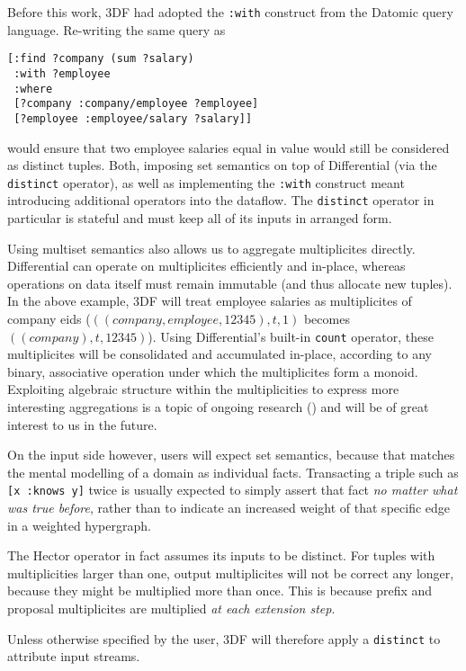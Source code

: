 \documentclass[../index.tex]{subfiles}
\begin{document}
Before this work, 3DF had adopted the \texttt{:with} construct from
the Datomic query language. Re-writing the same query as

\begin{verbatim}
[:find ?company (sum ?salary)
 :with ?employee
 :where
 [?company :company/employee ?employee]
 [?employee :employee/salary ?salary]]
\end{verbatim}

would ensure that two employee salaries equal in value would still be
considered as distinct tuples. Both, imposing set semantics on top of
Differential (via the \texttt{distinct} operator), as well as
implementing the \texttt{:with} construct meant introducing additional
operators into the dataflow. The \texttt{distinct} operator in
particular is stateful and must keep all of its inputs in arranged
form.

Using multiset semantics also allows us to aggregate multiplicites
directly. Differential can operate on multiplicites efficiently and
in-place, whereas operations on data itself must remain immutable (and
thus allocate new tuples). In the above example, 3DF will treat
employee salaries as multiplicites of company eids ($((company,
employee, 12345), t, 1)$ becomes $((company), t, 12345)$). Using
Differential's built-in \texttt{count} operator, these multiplicites
will be consolidated and accumulated in-place, according to any
binary, associative operation under which the multiplicites form a
monoid. Exploiting algebraic structure within the multiplicities to
express more interesting aggregations is a topic of ongoing research
(\cite{abo2016faq}) and will be of great interest to us in the future.

On the input side however, users will expect set semantics, because
that matches the mental modelling of a domain as individual
facts. Transacting a triple such as \texttt{[x :knows y]} twice is
usually expected to simply assert that fact \emph{no matter what was
  true before}, rather than to indicate an increased weight of that
specific edge in a weighted hypergraph.

The Hector operator in fact assumes its inputs to be distinct. For
tuples with multiplicities larger than one, output multiplicites will
not be correct any longer, because they might be multiplied more than
once. This is because prefix and proposal multiplicites are multiplied
\emph{at each extension step}.

Unless otherwise specified by the user, 3DF will therefore apply a
\texttt{distinct} to attribute input streams.
\end{document}

